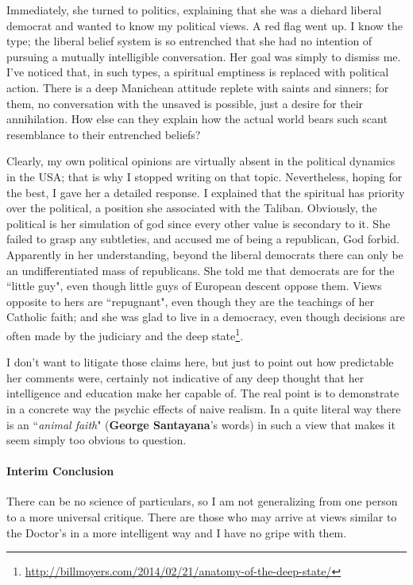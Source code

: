 Immediately, she turned to politics, explaining that she was a diehard liberal democrat and wanted to know my political views. A red flag went up. I know the type; the liberal belief system is so entrenched that she had no intention of pursuing a mutually intelligible conversation. Her goal was simply to dismiss me. I've noticed that, in such types, a spiritual emptiness is replaced with political action. There is a deep Manichean attitude replete with saints and sinners; for them, no conversation with the unsaved is possible, just a desire for their annihilation. How else can they explain how the actual world bears such scant resemblance to their entrenched beliefs?

Clearly, my own political opinions are virtually absent in the political dynamics in the USA; that is why I stopped writing on that topic. Nevertheless, hoping for the best, I gave her a detailed response. I explained that the spiritual has priority over the political, a position she associated with the Taliban. Obviously, the political is her simulation of god since every other value is secondary to it. She failed to grasp any subtleties, and accused me of being a republican, God forbid. Apparently in her understanding, beyond the liberal democrats there can only be an undifferentiated mass of republicans. She told me that democrats are for the ``little guy", even though little guys of European descent oppose them. Views opposite to hers are ``repugnant", even though they are the teachings of her Catholic faith; and she was glad to live in a democracy, even though decisions are often made by the judiciary and the deep state\footnote{\url{http://billmoyers.com/2014/02/21/anatomy-of-the-deep-state/}}.

I don't want to litigate those claims here, but just to point out how predictable her comments were, certainly not indicative of any deep thought that her intelligence and education make her capable of. The real point is to demonstrate in a concrete way the psychic effects of naive realism. In a quite literal way there is an ``\emph{animal faith}" (\textbf{George Santayana}'s words) in such a view that makes it seem simply too obvious to question.

\paragraph{Interim Conclusion}
There can be no science of particulars, so I am not generalizing from one person to a more universal critique. There are those who may arrive at views similar to the Doctor's in a more intelligent way and I have no gripe with them.

